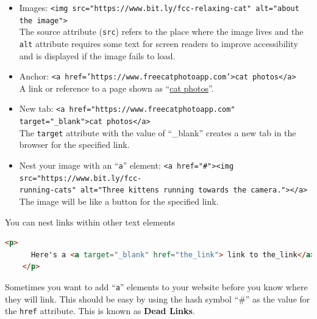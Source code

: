 \documentclass{article}
\begin{document}
    \begin{itemize}
    	\item Images: {\tt <img src="https://www.bit.ly/fcc-relaxing-cat" alt="about the image">}\\
    	
    	The source attribute ({\tt src}) refers to the place where the image lives and the {\tt alt} attribute requires some text for screen readers to improve accessibility and is displayed if the image fails to load.
    	
    	\item Anchor: {\tt <a href='https://www.freecatphotoapp.com'>cat photos</a>}\\
    	
    	A link or reference to a page shown as ``\underline{cat photos}''.
    	
    	\item New tab: {\tt <a href="https://www.freecatphotoapp.com" target="\_blank">cat photos</a>}\\
    	
    	The {\tt target} attribute with the value of ``\_blank'' creates a new tab in the browser for the specified link.
    	
    	\item Nest your image with an ``{\tt a}'' element: {\tt <a href="\#"><img src="https://www.bit.ly/fcc-\\running-cats" alt="Three kittens running towards the camera."></a>}\\
    	
    	The image will be like a button for the specified link.
    \end{itemize}

    \noindent You can nest links within other text elements
    
    \begin{lstlisting}[language=html]
    <p>
      Here's a <a target="_blank" href="the_link"> link to the_link</a>.
    </p>
    \end{lstlisting}

    \noindent Sometimes you want to add ``{\tt a}'' elements to your website before you know where they will link. This should be easy by using the hash symbol ``\#'' as the value for the {\tt href} attribute. This is known as \textbf{Dead Links}.
    
	\pagebreak
	
\end{document}
